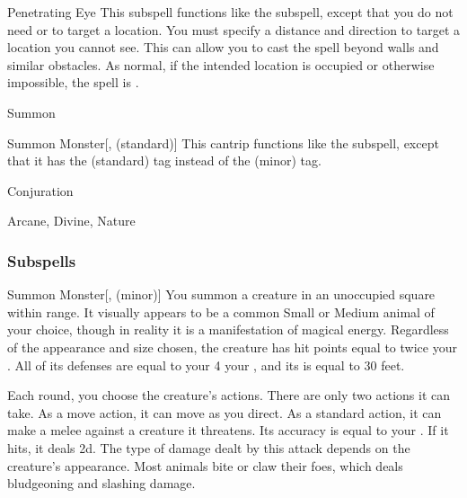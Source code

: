 \begin{ability}[\nth{4}]{Penetrating Eye}
This subspell functions like the  subspell, except that you do not need  or  to target a location.
You must specify a distance and direction to target a location you cannot see.
This can allow you to cast the spell beyond walls and similar obstacles.
As normal, if the intended location is occupied or otherwise impossible, the spell is .
\end{ability}
\vspace{0.25em}

\newpage
\begin{spellsection}{Summon}

\begin{spellheader}
\end{spellheader}


\begin{ability}{Summon Monster}[,  (standard)]
This cantrip functions like the  subspell, except that it has the  (standard) tag instead of the  (minor) tag.
\end{ability}




 Conjuration

 Arcane, Divine, Nature
\end{spellsection}


\subsubsection{Subspells}


\begin{ability}[\nth{1}]{Summon Monster}[,  (minor)]
You summon a creature in an unoccupied square within \rngmed range.
It visually appears to be a common Small or Medium animal of your choice, though in reality it is a manifestation of magical energy.
Regardless of the appearance and size chosen, the creature has hit points equal to twice your .
All of its defenses are equal to your 4 \add your , and its  is equal to 30 feet.

Each round, you choose the creature's actions.
There are only two actions it can take.
As a move action, it can move as you direct.
As a standard action, it can make a melee  against a creature it threatens.
Its accuracy is equal to your .
If it hits, it deals  \minus2d.
The type of damage dealt by this attack depends on the creature's appearance.
Most animals bite or claw their foes, which deals bludgeoning and slashing damage.
\end{ability}
\vspace{0.25em}


